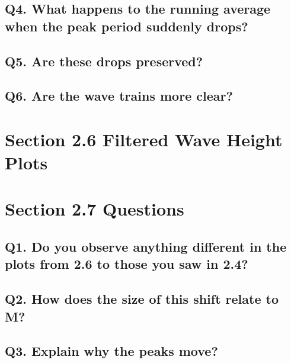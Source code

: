 \documentclass[titlepage]{scrartcl}
\begin{document}
    \subsection*{Q4. What happens to the running average when the peak period suddenly drops?}
    \subsection*{Q5. Are these drops preserved?}
    \subsection*{Q6. Are the wave trains more clear?}

    \section*{Section 2.6 Filtered Wave Height Plots}
    \begin{figure}[H]
    \end{figure}

    \section*{Section 2.7 Questions}
    \subsection*{Q1. Do you observe anything different in the plots from 2.6 to those you saw in 2.4?}
    \subsection*{Q2. How does the size of this shift relate to M?}
    \subsection*{Q3. Explain why the peaks move?}

\end{document}
